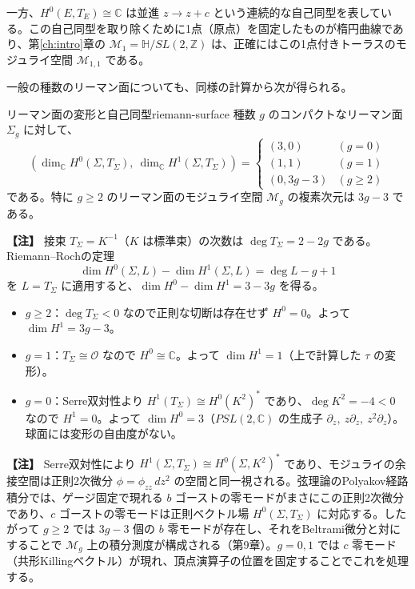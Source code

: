 \documentclass[uplatex, dvipdfmx, book]{jsbook}
\newenvironment{note}{\vspace{1ex}\par\footnotesize\noindent\textbf{【注】}}{\par\vspace{1ex}}
\begin{document}
一方、$H^0(E, T_E) \cong \mathbb{C}$ は並進 $z \to z + c$ という連続的な自己同型を表している。この自己同型を取り除くために1点（原点）を固定したものが楕円曲線であり、第\ref{ch:intro}章の $\mathcal{M}_1 = \mathbb{H}/SL(2,\mathbb{Z})$ は、正確にはこの1点付きトーラスのモジュライ空間 $\mathcal{M}_{1,1}$ である。

一般の種数のリーマン面についても、同様の計算から次が得られる。

\begin{myprop}{リーマン面の変形と自己同型}{riemann-surface}
種数 $g$ のコンパクトなリーマン面 $\Sigma_g$ に対して、
\begin{equation*}
    (\dim_{\mathbb{C}} H^0(\Sigma, T_\Sigma),\ \dim_{\mathbb{C}} H^1(\Sigma, T_\Sigma)) =
    \begin{cases}
        (3, 0) & (g = 0) \\
        (1, 1) & (g = 1) \\
        (0, 3g - 3) & (g \geq 2)
    \end{cases}
\end{equation*}
である。特に $g \geq 2$ のリーマン面のモジュライ空間 $\mathcal{M}_g$ の複素次元は $3g - 3$ である。
\end{myprop}

\begin{note}
接束 $T_\Sigma = K^{-1}$（$K$ は標準束）の次数は $\deg T_\Sigma = 2 - 2g$ である。Riemann--Rochの定理
\begin{equation*}
    \dim H^0(\Sigma, L) - \dim H^1(\Sigma, L) = \deg L - g + 1
\end{equation*}
を $L = T_\Sigma$ に適用すると、$\dim H^0 - \dim H^1 = 3 - 3g$ を得る。
\begin{itemize}
    \item $g \geq 2$：$\deg T_\Sigma < 0$ なので正則な切断は存在せず $H^0 = 0$。よって $\dim H^1 = 3g - 3$。
    \item $g = 1$：$T_\Sigma \cong \mathcal{O}$ なので $H^0 \cong \mathbb{C}$。よって $\dim H^1 = 1$（上で計算した $\tau$ の変形）。
    \item $g = 0$：Serre双対性より $H^1(T_\Sigma) \cong H^0(K^2)^*$ であり、$\deg K^2 = -4 < 0$ なので $H^1 = 0$。よって $\dim H^0 = 3$（$PSL(2, \mathbb{C})$ の生成子 $\partial_z,\ z\partial_z,\ z^2\partial_z$）。球面には変形の自由度がない。
\end{itemize}
\end{note}

\begin{note}
Serre双対性により $H^1(\Sigma, T_\Sigma) \cong H^0(\Sigma, K^2)^*$ であり、モジュライの余接空間は正則2次微分 $\phi = \phi_{zz}\,dz^2$ の空間と同一視される。弦理論のPolyakov経路積分では、ゲージ固定で現れる $b$ ゴーストの零モードがまさにこの正則2次微分であり、$c$ ゴーストの零モードは正則ベクトル場 $H^0(\Sigma, T_\Sigma)$ に対応する。したがって $g \geq 2$ では $3g-3$ 個の $b$ 零モードが存在し、それをBeltrami微分と対にすることで $\mathcal{M}_g$ 上の積分測度が構成される（第9章）。$g = 0, 1$ では $c$ 零モード（共形Killingベクトル）が現れ、頂点演算子の位置を固定することでこれを処理する。
\end{note}
\end{document}
